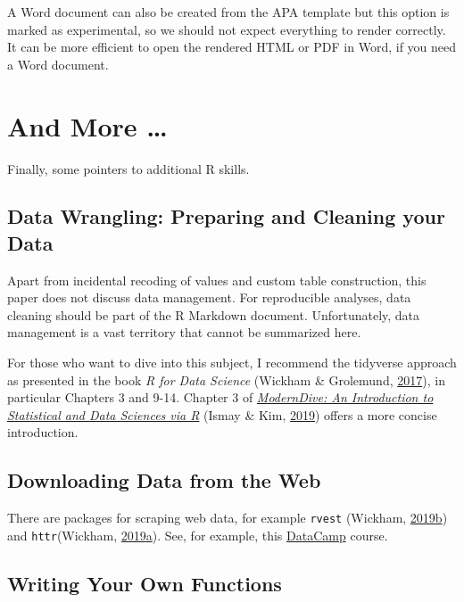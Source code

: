 \documentclass[doc,floatsintext]{apa6}
\begin{document}
A Word document can also be created from the APA template but this
option is marked as experimental, so we should not expect everything to
render correctly. It can be more efficient to open the rendered HTML or
PDF in Word, if you need a Word document.

\section{And More \ldots{}}\label{and-more}

Finally, some pointers to additional R skills.

\subsection{Data Wrangling: Preparing and Cleaning your
Data}\label{data-wrangling-preparing-and-cleaning-your-data}

Apart from incidental recoding of values and custom table construction,
this paper does not discuss data management. For reproducible analyses,
data cleaning should be part of the R Markdown document. Unfortunately,
data management is a vast territory that cannot be summarized here.

For those who want to dive into this subject, I recommend the tidyverse
approach as presented in the book \emph{R for Data Science} (Wickham \&
Grolemund, \protect\hyperlink{ref-WickhamDataScienceImport2017}{2017}),
in particular Chapters 3 and 9-14. Chapter 3 of
\href{https://moderndive.com/index.html}{\emph{ModernDive: An
Introduction to Statistical and Data Sciences via R}} (Ismay \& Kim,
\protect\hyperlink{ref-IsmayIntroductionStatisticalData}{2019}) offers a
more concise introduction.

\subsection{Downloading Data from the
Web}\label{downloading-data-from-the-web}

There are packages for scraping web data, for example \texttt{rvest}
(Wickham,
\protect\hyperlink{ref-R-rvest}{2019}\protect\hyperlink{ref-R-rvest}{b})
and \texttt{httr}(Wickham,
\protect\hyperlink{ref-R-httr}{2019}\protect\hyperlink{ref-R-httr}{a}).
See, for example, this
\href{https://www.datacamp.com/courses/working-with-web-data-in-r}{DataCamp}
course.

\subsection{Writing Your Own
Functions}\label{writing-your-own-functions}
\end{document}
